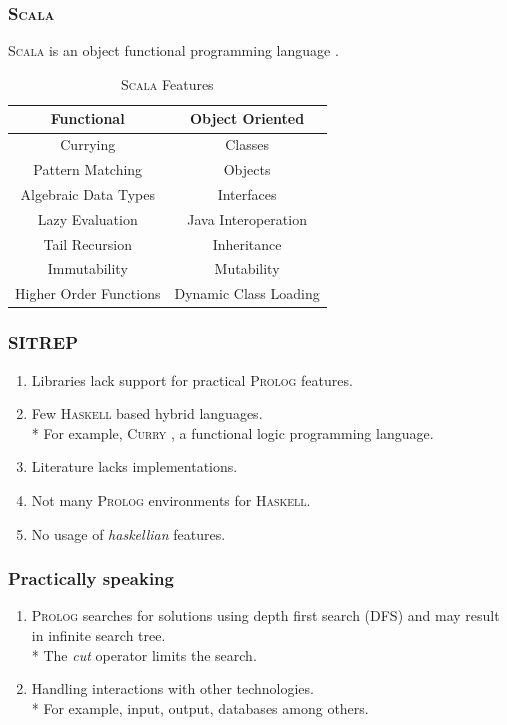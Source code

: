 \documentclass[aspectratio=1610]{beamer}
\begin{document}
\begin{frame}
\frametitle{\textsc{Scala}}
\textsc{Scala} is an object functional programming language \cite{scalawiki}.   

\begin{table}%
\begin{tabular}{|c|c|}
\hline
\textbf{Functional} & \textbf{Object Oriented}  \\
\hline
 Currying & Classes\\
\hline
Pattern Matching & Objects\\ 
\hline 
Algebraic Data Types & Interfaces\\ 
\hline 
Lazy Evaluation & Java Interoperation\\ 
\hline
Tail Recursion & Inheritance\\ 
\hline 
Immutability & Mutability\\
\hline
Higher Order Functions & Dynamic Class Loading\\
\hline
\end{tabular}
\caption{\textsc{Scala} Features \cite{scalaproglang}}
\label{}
\end{table}

\end{frame}


\begin{frame}
\frametitle{SITREP}
\begin{enumerate}
	\item Libraries lack support for practical \textsc{Prolog} features.
	
	\item Few \textsc{Haskell} based hybrid languages.
	\\* For example, \textsc{Curry} \cite{curryproglang}, a functional logic programming language.  
	
	\item Literature lacks implementations.
	
	\item Not many \textsc{Prolog} environments for \textsc{Haskell}. 
	
	\item No usage of \textit{haskellian} features. 
\end{enumerate}
\end{frame}


\begin{frame}
\frametitle{Practically speaking}
\begin{enumerate}
\item \textsc{Prolog} searches for solutions using depth first search (DFS) and may result in infinite search tree.
\\* The \textit{cut} operator limits the search. 
	
\item Handling interactions with other technologies.
\\* For example, input, output, databases among others.

\end{enumerate}
\end{frame}
\end{document}
